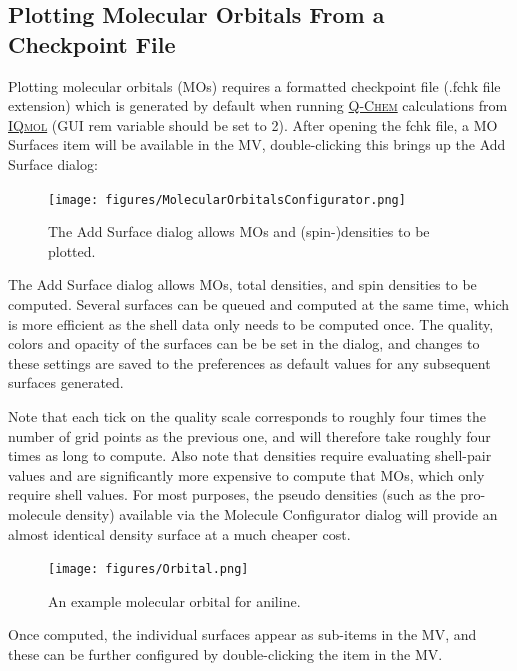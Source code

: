 \documentclass[a4paper,12pt]{article}
\newcommand{\qchem}{\href{http://q-chem.com}{{\scshape Q-Chem}}}
\newcommand{\iqmol}{\href{http://iqmol.org}{{\scshape IQmol}}}
\begin{document}
\subsection{Plotting Molecular Orbitals From a Checkpoint File}
\label{sec:mos}
Plotting molecular orbitals (MOs) requires a formatted checkpoint file (.fchk
file extension) which is generated by default when running \qchem{}
calculations from \iqmol{} (GUI rem variable should be set to 2).  After
opening the fchk file, a MO Surfaces item will be available in the MV,
double-clicking this brings up the Add Surface dialog:
\begin{figure}[h]
\begin{center}
\texttt{[image: figures/MolecularOrbitalsConfigurator.png]}
\caption{The Add Surface dialog allows MOs and (spin-)densities to be plotted.
} 
\label{fig:addsurface}
\end{center}
\end{figure}

The Add Surface dialog allows MOs, total densities, and spin densities  to be
computed.  Several surfaces can be queued and computed at the same time, which
is more efficient as the shell data only needs to be computed once.  The
quality, colors and opacity of the surfaces can be be set in the dialog, and
changes to these settings are saved to the preferences as default values for
any subsequent surfaces generated.

Note that each tick on the quality scale corresponds to roughly four times the
number of grid points as the previous one, and will therefore take roughly four
times as long to compute.  Also note that densities require evaluating
shell-pair values and are significantly more expensive to compute that MOs,
which only require shell values.  For most purposes, the pseudo densities (such
as the pro-molecule density) available via the Molecule Configurator dialog will
provide an almost identical density surface at a much cheaper cost.

\begin{figure}[h]
\begin{center}
\texttt{[image: figures/Orbital.png]}
\caption{An example molecular orbital for aniline.}
\label{fig:mo}
\end{center}
\end{figure}

Once computed, the individual surfaces appear as sub-items in the MV, and these
can be further configured by double-clicking the item in the MV.
\end{document}
